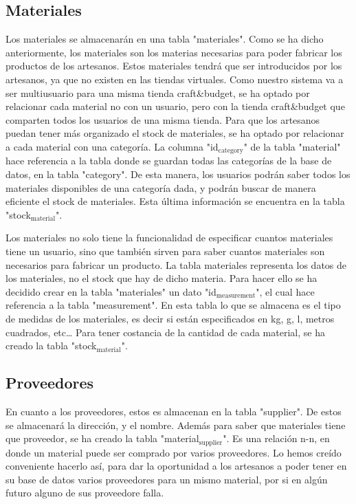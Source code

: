 \documentclass[11pt]{article}
\begin{document}
\subsection{Materiales}
\label{sec-2-5}
Los materiales se almacenarán en una tabla "materiales". Como se ha
dicho anteriormente, los materiales son los materias necesarias para
poder fabricar los productos de los artesanos. Estos materiales
tendrá que ser introducidos por los artesanos, ya que no existen en
las tiendas virtuales. Como nuestro sistema va a ser multiusuario
para una misma tienda craft\&budget, se ha optado por relacionar cada
material no con un usuario, pero con la tienda craft\&budget que
comparten todos los usuarios de una misma tienda. Para que los
artesanos puedan tener más organizado el stock de materiales, se ha
optado por relacionar a cada material con una categoría. La columna
"id$_{\text{category}}$" de la tabla "material" hace referencia a la tabla
donde se guardan todas las categorías de la base de datos, en la
tabla "category". De esta manera, los usuarios podrán saber todos los
materiales disponibles de una categoría dada, y podrán buscar de
manera eficiente el stock de materiales. Esta última información se
encuentra en la tabla "stock$_{\text{material}}$".

Los materiales no solo tiene la funcionalidad de especificar cuantos
materiales tiene un usuario, sino que también sirven para saber
cuantos materiales son necesarios para fabricar un producto.  La
tabla materiales representa los datos de los materiales, no el stock
que hay de dicho materia. Para hacer ello se ha decidido crear en la tabla
"materiales" un dato "id$_{\text{measurement}}$", el cual hace referencia a la
tabla "measurement". En esta tabla lo que se almacena es el tipo de
medidas de los materiales, es decir si están especificados en kg, g,
l, metros cuadrados, etc\ldots{}  Para tener costancia de la cantidad de
cada material, se ha creado la tabla "stock$_{\text{material}}$".

\subsection{Proveedores}
\label{sec-2-6}
En cuanto a los proveedores, estos es almacenan en la tabla
"supplier". De estos se almacenará la dirección, y el nombre. Además
para saber que materiales tiene que proveedor, se ha creado la tabla
"material$_{\text{supplier}}$". Es una relación n-n, en donde un material puede
ser comprado por varios proveedores. Lo hemos creído conveniente
hacerlo así, para dar la oportunidad a los artesanos a poder tener
en su base de datos varios proveedores para un mismo material, por
si en algún futuro alguno de sus proveedore falla.
\end{document}
